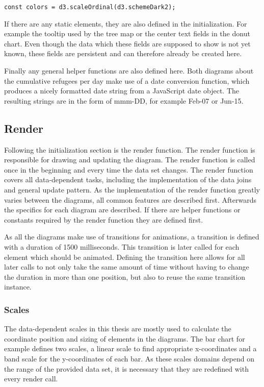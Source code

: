 \begin{minipage}{0.9\linewidth}
    \begin{lstlisting}[style=htmlCSSjs, captionpos=b, caption={Definition of the data independent color scale. \texttt{d3.schemeDarkv2} is a predefined list of color values which is  used as the range of the scale.}, label={color_scale}]
const colors = d3.scaleOrdinal(d3.schemeDark2);
    \end{lstlisting}
\end{minipage}

If there are any static elements, they are also defined in the initialization. For example the tooltip used by the tree map or the center text fields in the donut chart. Even though the data which these fields are supposed to show is not yet known, these fields are persistent and can therefore already be created here.

Finally any general helper functions are also defined here. Both diagrams about the cumulative refugees per day make use of a date conversion function, which produces a nicely formatted date string from a JavaScript date object. The resulting strings are in the form of mmm-DD, for example Feb-07 or Jun-15.

\subsection{Render}\label{sec:render}
Following the initialization section is the render function. The render function is responsible for drawing and updating the diagram. The render function is called once in the beginning and every time the data set changes. The render function covers all data-dependent tasks, including the implementation of the data joins and general update pattern. As the implementation of the render function greatly varies between the diagrams, all common features are described first. Afterwards the specifics for each diagram are described. If there are helper functions or constants required by the render function they are defined first. 

As all the diagrams make use of transitions for animations, a transition is defined with a duration of 1500 milliseconds. This transition is later called for each element which should be animated. Defining the transition here allows for all later calls to not only take the same amount of time without having to change the duration in more than one position, but also to reuse the same transition instance.

\subsubsection{Scales}
The data-dependent scales in this thesis are mostly used to calculate the coordinate position and sizing of elements in the diagrams. The bar chart for example defines two scales, a linear scale to find appropriate x-coordinates and a band scale for the y-coordinates of each bar. As these scales domains depend on the range of the provided data set, it is necessary that they are redefined with every render call.

